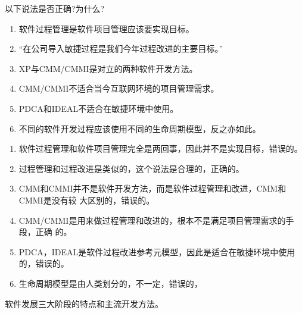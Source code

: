 \begin{problem}
以下说法是否正确?为什么?
\begin{enumerate}[label=\arabic*.]
    \item 软件过程管理是软件项目管理应该要实现目标。
    \item “在公司导入敏捷过程是我们今年过程改进的主要目标。”
    \item XP与CMM/CMMI是对立的两种软件开发方法。
    \item CMM/CMMI不适合当今互联网环境的项目管理需求。
    \item PDCA和IDEAL不适合在敏捷环境中使用。
    \item 不同的软件开发过程应该使用不同的生命周期模型，反之亦如此。
\end{enumerate}
\end{problem}

\begin{solution}
\begin{enumerate}[label=\arabic*.]
    \item 软件过程管理和软件项目管理完全是两回事，因此并不是实现目标，错误的。
    \item 过程管理和过程改进是类似的，这个说法是合理的，正确的。
    \item CMM和CMMI并不是软件开发方法，而是软件过程管理和改进，CMM和CMMI是没有较
    大区别的，错误的。
    \item CMM/CMMI是用来做过程管理和改进的，根本不是满足项目管理需求的手段，正确
    的。
    \item PDCA，IDEAL是软件过程改进参考元模型，因此是适合在敏捷环境中使用的，错误的。
    \item 生命周期模型是由人类划分的，不一定，错误的，
\end{enumerate}
\end{solution}



\begin{problem}[2018]
软件发展三大阶段的特点和主流开发方法。
\end{problem}

